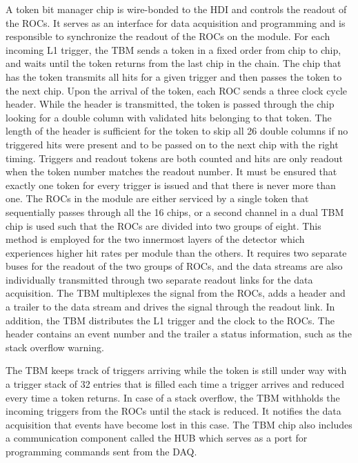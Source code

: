 A token bit manager chip is wire-bonded to the HDI and controls the readout of the ROCs.
It serves as an interface for data acquisition and programming and is responsible to synchronize the readout of the ROCs on the module.
For each incoming L1 trigger, the TBM sends a token in a fixed order from chip to chip, and waits until the token returns from the last chip in the chain.
The chip that has the token transmits all hits for a given trigger and then passes the token to the next chip.
Upon the arrival of the token, each ROC sends a three clock cycle header.
While the header is transmitted, the token is passed through the chip looking for a double column with validated hits belonging to that token.
The length of the header is sufficient for the token to skip all 26 double columns if no triggered hits were present and to be passed on to the next chip with the right timing.
Triggers and readout tokens are both counted and hits are only readout when the token number matches the readout number.
It must be ensured that exactly one token for every trigger is issued and that there is never more than one.
The ROCs in the module are either serviced by a single token that sequentially passes through all the 16 chips, or a second channel in a dual TBM chip is used such that the ROCs are divided into two groups of eight.
This method is employed for the two innermost layers of the detector which experiences higher hit rates per module than the others.
It requires two separate buses for the readout of the two groups of ROCs, and the data streams are also individually transmitted through two separate readout links for the data acquisition. 
The TBM multiplexes the signal from the ROCs, adds a header and a trailer to the data stream and drives the signal through the readout link. In addition, the TBM distributes the L1 trigger and the clock to the ROCs.
The header contains an event number and the trailer a status information, such as the stack overflow warning.

The TBM keeps track of triggers arriving while the token is still under way with a trigger stack of 32 entries that is filled each time a trigger arrives and reduced every time a token returns.
In case of a stack overflow, the TBM withholds the incoming triggers from the ROCs until the stack is reduced. It notifies the data acquisition that events have become lost in this case.
The TBM chip also includes a communication component called the HUB which serves as a port for programming commands sent from the DAQ.

